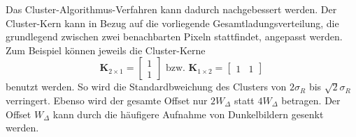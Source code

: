 \noindent
Das Cluster-Algorithmus-Verfahren kann dadurch nachgebessert werden. Der Cluster-Kern kann in Bezug auf die vorliegende Gesamtladungsverteilung, die grundlegend zwischen zwei benachbarten Pixeln stattfindet, angepasst werden. Zum Beispiel können jeweils die Cluster-Kerne
\begin{equation}
    \mathbf{K}_{2\times1} = \begin{bmatrix}
1\\
1
\end{bmatrix}
\text{ bzw. }
    \mathbf{K}_{1\times2} = \begin{bmatrix}
1 & 1
\end{bmatrix}
\end{equation}
benutzt werden. So wird die Standardbweichung des Clusters von $2\sigma_R$ bis $\sqrt{2}\sigma_R$ verringert. Ebenso wird der gesamte Offset nur $2W_\Delta$ statt $4W_\Delta$ betragen. Der Offset $W_\Delta$ kann durch die häufigere Aufnahme von Dunkelbildern gesenkt werden.